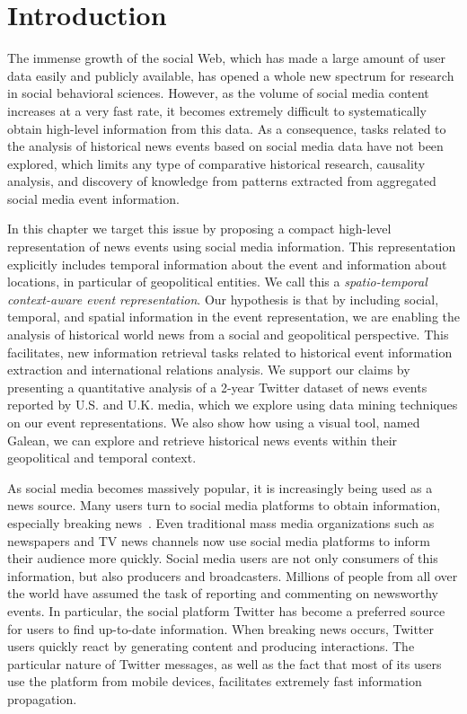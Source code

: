 
\section{Introduction}\label{sec:geo-introduction}

The immense growth of the social Web, which has made a large amount of user data
easily and publicly available, has opened a whole new spectrum for research in
social behavioral sciences.  
%
However, as the volume of social media content increases at a very fast rate, it
becomes extremely difficult to systematically obtain high-level information from
this data.  
%
As a consequence, tasks related to the analysis of historical news events based
on social media data have not been explored, which limits any type of
comparative historical research, causality analysis, and discovery of knowledge
from patterns extracted from aggregated social media event information.

In this chapter we target this issue by proposing a compact high-level
representation of news events using social media information. 
%
This representation explicitly includes temporal information about the event and
information about locations, in particular of geopolitical entities. 
%
We call this a {\em spatio-temporal context-aware event representation}. 
%
Our hypothesis is that by including social, temporal, and spatial information in
the event representation, we are enabling the analysis of historical world news
from a social and geopolitical perspective.  
%
This facilitates, new information retrieval tasks related to historical event
information extraction and international relations analysis. 
%
We support our claims by presenting a quantitative analysis of a 2-year Twitter
dataset of news events reported by U.S. and U.K.  media, which we explore using
data mining techniques on our event representations. 
%
We also show how using a visual tool, named Galean, we can explore and retrieve
historical news events within their geopolitical and temporal context.



As social media becomes massively popular, it is increasingly being used as a news source.  
%
Many users turn to social media platforms to obtain information, especially
breaking news~\cite{Rogers:2013:DTT:2464464.2464511}. 
%
Even traditional mass media organizations such as newspapers and TV news
channels now use social media platforms to inform their audience more quickly.
%
Social media users are not only consumers of this information, but also
producers and broadcasters. 
%
Millions of people from all over the world have assumed the task of reporting
and commenting on newsworthy events.  
%
In particular, the social platform Twitter has become a preferred source for
users to find up-to-date information.  
%
When breaking news occurs, Twitter users quickly react by generating content and
producing interactions.  
%
The particular nature of Twitter messages, as well as the fact that most of its
users use the platform from mobile devices, facilitates extremely fast
information propagation.

